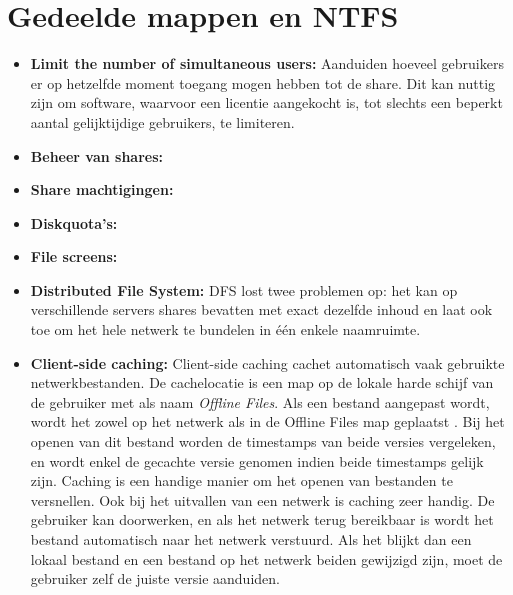 	\section{Gedeelde mappen en NTFS}
	\begin{enumerate}
		 { 
			\begin{itemize}
                \item \textbf{Limit the number of simultaneous users:} Aanduiden hoeveel gebruikers er op hetzelfde moment toegang mogen hebben tot de share. Dit kan nuttig zijn om software, waarvoor een licentie aangekocht is, tot slechts een beperkt aantal gelijktijdige gebruikers, te limiteren. 

                \item \textbf{Beheer van shares:}
                \item \textbf{Share machtigingen:}
                \item \textbf{Diskquota's:}
                \item \textbf{File screens:}
                \item \textbf{Distributed File System:} DFS lost twee problemen op: het kan op verschillende servers shares bevatten met exact dezelfde inhoud en laat ook toe om het hele netwerk te bundelen in één enkele naamruimte.
                \item \textbf{Client-side caching:} Client-side caching cachet automatisch vaak gebruikte netwerkbestanden. De cachelocatie is een map op de lokale harde schijf van de gebruiker met als naam \textit{Offline Files}. Als een bestand aangepast wordt, wordt het zowel op het netwerk als in de Offline Files map geplaatst . Bij het openen van dit bestand worden de timestamps van beide versies vergeleken, en wordt enkel de gecachte versie genomen indien beide timestamps gelijk zijn. Caching is een handige manier om het openen van bestanden te versnellen. Ook bij het uitvallen van een netwerk is caching zeer handig. De gebruiker kan doorwerken, en als het netwerk terug bereikbaar is wordt het bestand automatisch naar het netwerk verstuurd. Als het blijkt dan een lokaal bestand en een bestand op het netwerk beiden gewijzigd zijn, moet de gebruiker zelf de juiste versie aanduiden.
                

\end{itemize}}
\end{enumerate}
